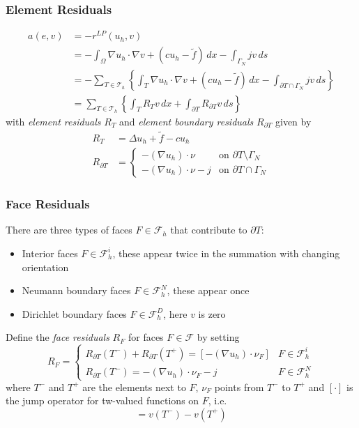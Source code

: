 \documentclass[aspectratio=169,11pt]{beamer}
\theoremstyle{definition}
\begin{document}
\begin{frame}
\frametitle{Element Residuals}
\begin{align*}
  a(e,v) &= - r^{LP}(u_h,v) \\
  &= - \int_\Omega \nabla u_h \cdot \nabla v + (c u_h - \tilde{f})\,dx - \int_{\Gamma_N} jv\,ds \\
  &= - \sum_{T \in \mathcal{T}_h} \left\{ \int_T \nabla u_h \cdot \nabla v + (c u_h - \tilde{f})\,dx - \int_{\partial T \cap \Gamma_N} jv\,ds \right\} \\
  &= \sum_{T \in \mathcal{T}_h} \left\{ \int_T R_T v \,dx + \int_{\partial T} R_{\partial T} v \,ds \right\}
\end{align*}
with \emph{element residuals} $R_T$ and \emph{element boundary residuals} $R_{\partial T}$ given by
\begin{align*}
  R_T &= \Delta u_h + \tilde{f} - c u_h \\
  R_{\partial T} &= \begin{cases} - (\nabla u_h) \cdot \nu & \text{on } \partial T \setminus \Gamma_N \\
    -(\nabla u_h) \cdot \nu - j & \text{on } \partial T \cap \Gamma_N \end{cases}
\end{align*}
\end{frame}

\begin{frame}
\frametitle{Face Residuals}
There are three types of faces $F \in \mathcal{F}_h$ that contribute to $\partial T$:
\begin{itemize}
  \item Interior faces $F \in \mathcal{F}_h^i$, these appear twice in the summation with changing orientation
  \item Neumann boundary faces $F \in \mathcal{F}_h^N$, these appear once
  \item Dirichlet boundary faces $F \in \mathcal{F}_h^D$, here $v$ is zero
\end{itemize}

Define the \emph{face residuals} $R_F$ for faces $F \in \mathcal{F}$ by setting
\begin{equation*}
  R_F = \begin{cases} R_{\partial T}(T^-) + R_{\partial T}(T^+) = [- (\nabla u_h) \cdot \nu_F] & F \in \mathcal{F}_h^i \\
    R_{\partial T}(T^-) = - (\nabla u_h) \cdot \nu_F - j & F \in \mathcal{F}_h^N \end{cases}
\end{equation*}
where $T^-$ and $T^+$ are the elements next to $F$, $\nu_F$ points from $T^-$ to $T^+$ and $[\cdot]$ is the jump operator for tw-valued functions on $F$, i.e.
\begin{equation*}
  [v] = v(T^-) - v(T^+)
\end{equation*}
\end{frame}
\end{document}
